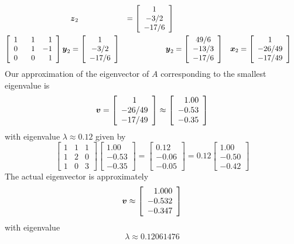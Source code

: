 \begin{example}
\begin{align*}
& \boldsymbol{z}_2 &= \left[ \begin{array}{c} 1 \\ -3/2 \\ -17/6 \end{array} \right] \\
\left[ \begin{array}{rrr} 1 & 1 & 1 \\ 0 & 1 & -1 \\ 0 & \phantom{+}0 & 1 \end{array} \right] \boldsymbol{y}_2 &= \left[ \begin{array}{c} 1 \\ -3/2 \\ -17/6 \end{array} \right]
& \boldsymbol{y}_2 &= \left[ \begin{array}{c} 49/6 \\ -13/3 \\ -17/6 \end{array} \right]
& \boldsymbol{x}_2 &= \left[ \begin{array}{c} 1 \\ -26/49 \\ -17/49 \end{array} \right]
\end{align*}
Our approximation of the eigenvector of $A$ corresponding to the smallest eigenvalue is
$$
\boldsymbol{v} = \left[ \begin{array}{c} 1 \\ -26/49 \\ -17/49 \end{array} \right]
\approx
\left[ \begin{array}{r} 1.00 \\ -0.53 \\ -0.35 \end{array} \right]
$$
with eigenvalue $\lambda \approx 0.12$ given by
$$
\begin{bmatrix} 1 & 1 & 1 \\ 1 & 2 & 0 \\ 1 & 0 & 3 \end{bmatrix}
\left[ \begin{array}{r} 1.00 \\ -0.53 \\ -0.35 \end{array} \right]
=
\left[ \begin{array}{r} 0.12 \\ -0.06 \\ -0.05 \end{array} \right]
=
0.12 \left[ \begin{array}{r} 1.00 \\ -0.50 \\ -0.42 \end{array} \right]
$$
The actual eigenvector is approximately
$$
\boldsymbol{v} \approx \left[ \begin{array}{r} 1.000 \\ -0.532 \\ -0.347 \end{array} \right]
$$
with eigenvalue
$$
\lambda \approx 0.12061476
$$
\end{example}